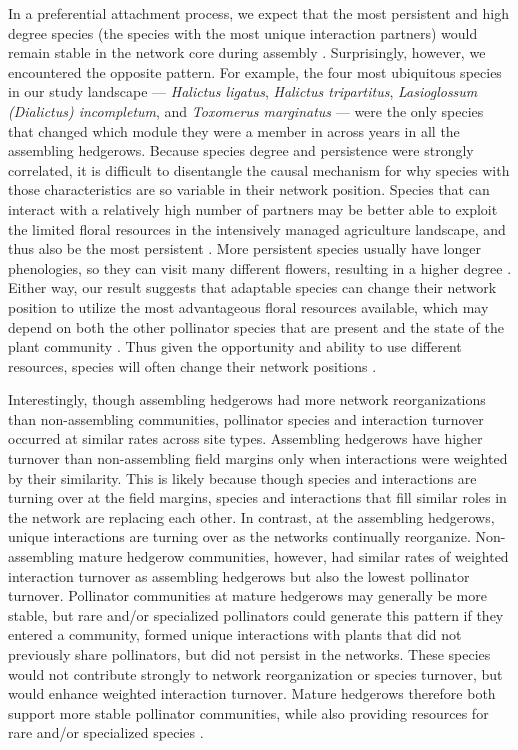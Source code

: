 \documentclass[12pt]{article}
\begin{document}
In a preferential attachment process, we expect that the most
persistent and high degree species (the species with the most unique
interaction partners) would remain stable in the network core during
assembly \citep{barabasi1999emergence}. Surprisingly, however, we
encountered the opposite pattern. For example, the four most
ubiquitous species in our study landscape --- \textit{Halictus
  ligatus}, \textit{Halictus tripartitus}, \textit{Lasioglossum
  (Dialictus) incompletum}, and \textit{Toxomerus marginatus} --- were
the only species that changed which module they were a member in
across years in all the assembling hedgerows. Because species degree
and persistence were strongly correlated, it is difficult to
disentangle the causal mechanism for why species with those
characteristics are so variable in their network position. Species
that can interact with a relatively high number of partners may be
better able to exploit the limited floral resources in the intensively
managed agriculture landscape, and thus also be the most persistent
\citep[in ant-plant mutualisms, ][]{diaz2010changes}. More persistent
species usually have longer phenologies, so they can visit many
different flowers, resulting in a higher degree \citep{Vazquez2009,
  fort2016abundance}. Either way, our result suggests that adaptable
species can change their network position to utilize the most
advantageous floral resources available, which may depend on both the
other pollinator species that are present and the state of the plant
community \citep{Waser1996, gomez2006ecological,
  macleod2016measuring}. Thus given the opportunity and ability to use
different resources, species will often change their network positions
\citep{macleod2016measuring}.

Interestingly, though assembling hedgerows had more network
reorganizations than non-assembling communities, pollinator species
and interaction turnover occurred at similar rates across site types.
Assembling hedgerows have higher turnover than non-assembling field
margins only when interactions were weighted by their similarity. This
is likely because though species and interactions are turning over at
the field margins, species and interactions that fill similar roles in
the network are replacing each other. In contrast, at the assembling
hedgerows, unique interactions are turning over as the networks
continually reorganize. Non-assembling mature hedgerow communities,
however, had similar rates of weighted interaction turnover as
assembling hedgerows but also the lowest pollinator
turnover. Pollinator communities at mature hedgerows may generally be
more stable, but rare and/or specialized pollinators could generate
this pattern if they entered a community, formed unique interactions
with plants that did not previously share pollinators, but did not
persist in the networks. These species would not contribute strongly
to network reorganization or species turnover, but would enhance
weighted interaction turnover. Mature hedgerows therefore both support
more stable pollinator communities, while also providing resources for
rare and/or specialized species \citep{kremen-2015-602,
  mgonigle-2015-x}.
\end{document}
